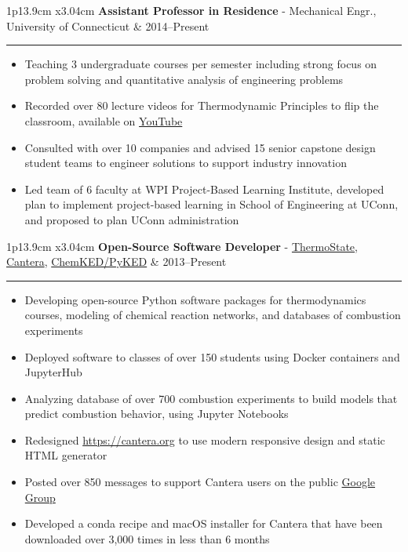 \documentclass[11pt]{article}
\newenvironment{cvevent}[3]{%
%
\begin{tabular*}{1\textwidth}{p{13.9cm} x{3.04cm}}%
    \textbf{#2} - \textcolor{bgcol}{#3} & \vspace{2.5pt}\textcolor{sectcol}{#1}%
\end{tabular*}%

\vspace{-8pt}%
\textcolor{softcol}{\hrule}%
\vspace{6pt}%
}{
\vspace{6pt}
}
\begin{document}
\begin{cvevent}{2014--Present}%
{Assistant Professor in Residence}%
{Mechanical Engr., University of Connecticut}%
\begin{itemize}
    \item Teaching 3 undergraduate courses per semester including strong focus on problem
    solving and quantitative analysis of engineering problems
    \item Recorded over 80 lecture videos for Thermodynamic Principles to flip the
    classroom, available on
    \href{https://www.youtube.com/playlist?list=PLnOxmF4n89SXsKxFb6ug0ThMNpqJST5_X}{YouTube}
    \item Consulted with over 10 companies and advised 15 senior capstone design student
    teams to engineer solutions to support industry innovation
    \item Led team of 6 faculty at WPI Project-Based Learning Institute, developed
    plan to implement project-based learning in School of Engineering at UConn, and
    proposed to plan UConn administration
\end{itemize}
\end{cvevent}

\begin{cvevent}{2013--Present}
{Open-Source Software Developer}
{\href{https://github.com/bryanwweber/thermostate}{ThermoState},
\href{https://github.com/cantera}{Cantera},
\href{https://github.com/pr-omethe-us/pyked}{ChemKED/PyKED}}
\begin{itemize}
    \item Developing open-source Python software packages for thermodynamics courses,
    modeling of chemical reaction networks, and databases of combustion experiments
    \item Deployed software to classes of over 150 students using Docker containers and
    JupyterHub
    \item Analyzing database of over 700 combustion experiments to build models that
    predict combustion behavior, using Jupyter Notebooks
    \item Redesigned \url{https://cantera.org} to use modern responsive design and static
    HTML generator
    \item Posted over 850 messages to support Cantera users on the public
    \href{https://groups.google.com/forum/#!forum/cantera-users}{Google Group}
    \item Developed a conda recipe and macOS installer for Cantera that have been
    downloaded over 3,000 times in less than 6 months
\end{itemize}
\end{cvevent}
\end{document}
